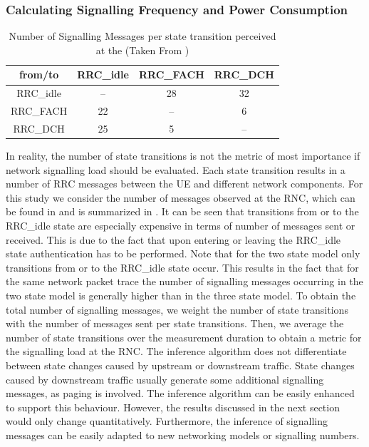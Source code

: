 \subsubsection*{Calculating Signalling Frequency and Power Consumption}\label{sec:network:network_traces:calculating_metrics}

\begin{table}\centering
\centering
\begin{tabular}{cccc}
	\toprule
    from/to & \gls{RRC_idle} & \gls{RRC_FACH} & \gls{RRC_DCH}\\
    \midrule
    \gls{RRC_idle} & -- & 28 & 32\\
    \gls{RRC_FACH} & 22 & -- & 6\\
    \gls{RRC_DCH} & 25 & 5 & --\\
    \bottomrule    
	\end{tabular}
  \caption{Number of Signalling Messages per  state transition perceived at the  (Taken From \cite{3GPP_RRC_Spec})}
  \label{tab:network:network_traces:calculating_metrics:signalling_messages}
\end{table}

In reality, the number of state transitions is not the metric of most importance if network signalling load should be evaluated.
Each state transition results in a number of \gls{RRC} messages between the \gls{UE} and different network components.
For this study we consider the number of messages observed at the \gls{RNC}, which can be found in \cite{3GPP_RRC_Spec} and is summarized in .
It can be seen that transitions from or to the \gls{RRC_idle} state are especially expensive in terms of number of messages sent or received.
This is due to the fact that upon entering or leaving the \gls{RRC_idle} state authentication has to be performed. 
Note that for the two state model only transitions from or to the \gls{RRC_idle} state occur.
This results in the fact that for the same network packet trace the number of signalling messages occurring in the two state model is generally higher than in the three state model.
To obtain the total number of signalling messages, we weight the number of state transitions with the number of messages sent per state transitions.
Then, we average the number of state transitions over the measurement duration to obtain a metric for the signalling load at the \gls{RNC}.
The inference algorithm does not differentiate between state changes caused by upstream or downstream traffic.
State changes caused by downstream traffic usually generate some additional signalling messages, as paging is involved.
The inference algorithm can be easily enhanced to support this behaviour.
However, the results discussed in the next section would only change quantitatively.
Furthermore, the inference of signalling messages can be easily adapted to new networking models or signalling numbers.

